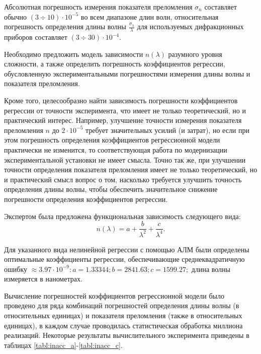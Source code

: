 \documentclass[11pt,a4paper]{article}
\theoremstyle{definition}
\begin{document}
Абсолютная погрешность измерения показателя преломления $\sigma_n$
составляет обычно $(3 \div 10) \cdot 10^{-5}$ во всем диапазоне длин волн, относительная
погрешность определения длины волны $\frac{\sigma_{\lambda}}{\lambda}$ для используемых
дифракционных приборов составляет $(3 \div 30) \cdot 10^{-4}$.

Необходимо предложить модель зависимости $n(\lambda)$ разумного уровня
сложности, а также определить погрешность коэффициентов регрессии,
обусловленную экспериментальными погрешностями измерения длины волны
и показателя преломления.

Кроме того, целесообразно найти зависимость
погрешности коэффициентов регрессии от точности эксперимента, что имеет
не только теоретический, но и практический интерес. Например, улучшение
точности измерения показателя преломления $n$ до $2 \cdot 10^{-5}$ требует значительных
усилий (и затрат), но если при этом погрешность определения коэффициентов
регрессионной модели практически не изменится, то соответствующая работа по
модернизации экспериментальной установки не имеет смысла. Точно так же,
при улучшении точности определения показателя преломления имеет не
только теоретический, но и практический смысл вопрос о том, насколько требуется
улучшить точность определения длины волны, чтобы
обеспечить значительное снижение погрешности определения коэффициентов
регрессии.

Экспертом была предложена функциональная зависимость
следующего вида:
\begin{equation}
  n(\lambda) = a + \frac{b}{\lambda^2} + \frac{c}{\lambda^4}.
  \label{eq:polymer_formula}
\end{equation}

Для указанного вида нелинейной регрессии с помощью АЛМ были
определены оптимальные коэффициенты регрессии, обеспечивающие
среднеквадратичную ошибку $\approx 3.97 \cdot 10^{-9}: a = 1.33344; b = 2841.63; c = 1599.27;$
длина волны измеряется в нанометрах.

Вычисление погрешностей коэффициентов регрессионной модели было
проведено для ряда комбинаций погрешностей определения длины волны (в
относительных единицах) и показателя преломления (также в относительных
единицах), в каждом случае проводилась статистическая обработка миллиона
реализаций. Некоторые результаты вычислительного эксперимента приведены
в таблицах \ref{tabl:inacc_a}-\ref{tabl:inacc_c}.
\end{document}

